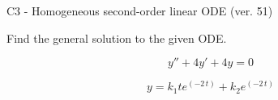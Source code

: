 \begin{exercise}
  \begin{exerciseTitle}C3 - Homogeneous second-order linear ODE (ver. 51)\end{exerciseTitle}
  \begin{exerciseStatement}
    
Find the general solution to the given ODE.

    
\[y''+4y'+4y = 0\]

  \end{exerciseStatement}
  \begin{exerciseAnswer}
    
\[y= k_{1} t e^{\left(-2 \, t\right)} + k_{2} e^{\left(-2 \, t\right)}\]

  \end{exerciseAnswer}
\end{exercise}